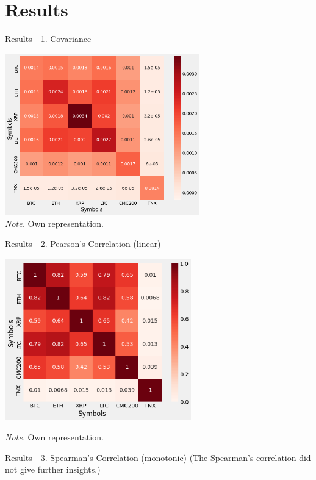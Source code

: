 \documentclass[11pt]{beamer}
\begin{document}
\section{Results}
\begin{frame}{Results - 1. Covariance}

    \centering
    \includegraphics[height=7cm,keepaspectratio]{images/covariance_heatmap.png} \\

\tiny{\textit{Note.} Own representation.}
\end{frame}



\begin{frame}{Results - 2. Pearson’s Correlation (linear)}

    \centering
    \includegraphics[height=7cm,keepaspectratio]{images/pearson_heatmap.png}

\tiny{\textit{Note.} Own representation.}
\end{frame}


\begin{frame}{Results - 3. Spearman’s Correlation (monotonic)}
\centering
    (The Spearman's correlation did not give further insights.)
\end{frame}
\end{document}
